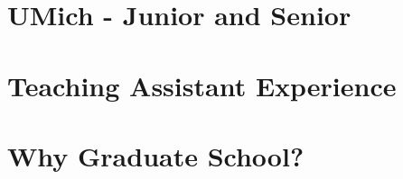 \documentclass[12pt]{article}
\begin{document}

\section {UMich - Junior and Senior}





\section{Teaching Assistant Experience}

\section{Why Graduate School?}



\end{document}
